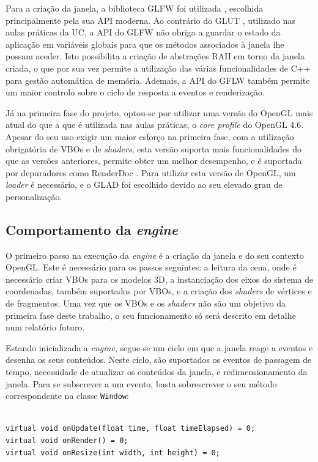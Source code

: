\documentclass[12pt, a4paper]{article}
\begin{document}
Para a criação da janela, a biblioteca GLFW foi utilizada \cite{glfw}, escolhida principalmente pela
sua API moderna. Ao contrário do GLUT \cite{glut}, utilizado nas aulas práticas da UC, a API do GLFW
não obriga a guardar o estado da aplicação em variáveis globais para que os métodos associados à
janela lhe possam aceder. Isto possibilita a criação de abstrações RAII em torno da janela criada, o
que por sua vez permite a utilização das várias funcionalidades de C++ para gestão automática de
memória. Ademais, a API do GFLW também permite um maior controlo sobre o ciclo de resposta a eventos
e renderização.

Já na primeira fase do projeto, optou-se por utilizar uma versão do OpenGL mais atual do que a que é
utilizada nas aulas práticas, o \emph{core profile} do OpenGL 4.6. Apesar do seu uso exigir um maior
esforço na primeira fase, com a utilização obrigatória de VBOs e de \emph{shaders}, esta versão
suporta mais funcionalidades do que as versões anteriores, permite obter um melhor desempenho, e é
suportada por depuradores como RenderDoc \cite{renderdoc}. Para utilizar esta versão de OpenGL, um
\emph{loader} é necessário, e o GLAD \cite{glad} foi escolhido devido ao seu elevado grau de
personalização.

\subsection{Comportamento da \emph{engine}}

O primeiro passo na execução da \emph{engine} é a criação da janela e do seu contexto OpenGL. Este é
necessário para os passos seguintes: a leitura da cena, onde é necessário criar VBOs para os
modelos 3D, a instanciação dos eixos do sistema de coordenadas, também suportados por VBOs, e a
criação dos \emph{shaders} de vértices e de fragmentos. Uma vez que os VBOs e os \emph{shaders} não
são um objetivo da primeira fase deste trabalho, o seu funcionamento só será descrito em detalhe num
relatório futuro.

Estando inicializada a \emph{engine}, segue-se um ciclo em que a janela reage a eventos e desenha os
seus conteúdos. Neste ciclo, são suportados os eventos de passagem de tempo, necessidade de
atualizar os conteúdos da janela, e redimensionamento da janela. Para se subscrever a um evento,
basta sobrescrever o seu método correspondente na classe \texttt{Window}:

\begin{lstlisting}

virtual void onUpdate(float time, float timeElapsed) = 0;
virtual void onRender() = 0;
virtual void onResize(int width, int height) = 0;
\end{lstlisting}
\end{document}
